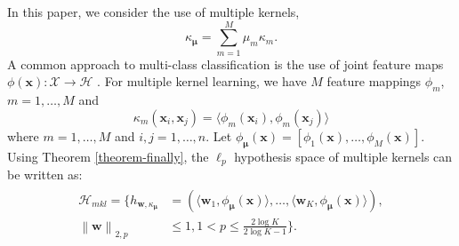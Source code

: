 \documentclass{article}
\begin{document}
In this paper, we consider the use of multiple kernels,
$$\kappa_{\bm \mu}=\sum_{m=1}^M \mu_m\kappa_m.$$
A common approach to multi-class classification is the use of joint feature
maps $\phi(\mathbf x):\mathcal X \to \mathcal H$ \cite{TsochantaridisHJA04}.
For multiple kernel learning, we have $M$ feature mappings $\phi_m$, $m=1,\ldots,M$ and
$$\kappa_m(\mathbf x_i,\mathbf x_j)=\langle \phi_m(\mathbf x_i), \phi_m(\mathbf x_j)\rangle$$where $
m=1,\ldots,M$ and $i,j=1, \ldots, n$.
Let $\phi_{\bm \mu}(\mathbf x)=[\phi_1(\mathbf x),\ldots,\phi_M(\mathbf x)]$.
Using Theorem \ref{theorem-finally}, the $\ell_p$ hypothesis space of multiple kernels can be written as:
 \begin{align*}
 \label{hypothspapcemkl}
   \begin{aligned}
   \mathcal{H}_{mkl}=\Big\{h_{\mathbf{w},\kappa_{\bm \mu}}&=\left(\langle \mathbf w_1,\phi_{\bm \mu}(\mathbf x)\rangle,\ldots, \langle\mathbf w_K,\phi_{\bm \mu}(\mathbf x)\rangle\right),\\
   \left\|\mathbf  w \right\|_{2,p}&\leq 1, 1 < p \leq \frac{2\log K}{2\log K-1}
  \Big\}.
   \end{aligned}
 \end{align*}
\end{document}
